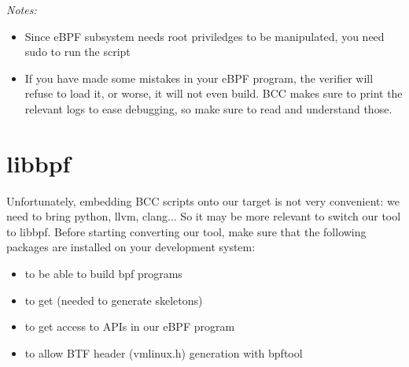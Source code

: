 {\em Notes:
\begin{itemize}
    \item Since eBPF subsystem needs root priviledges to be manipulated, you need sudo to run the script
    \item If you have made some mistakes in your eBPF program, the verifier
    will refuse to load it, or worse, it will not even build. BCC makes sure to
    print the relevant logs to ease debugging, so make sure to read
    and understand those.
\end{itemize}}

\section{libbpf}

Unfortunately, embedding BCC scripts onto our target is not very convenient: we need to bring python, llvm, clang... So it may be more relevant to switch our tool to libbpf. Before starting converting our tool, make sure that the following packages are installed on your development system:
\begin{itemize}
  \item {} to be able to build bpf programs
  \item {} to get  (needed to generate skeletons)
  \item {} to get access to  APIs in our eBPF program
  \item {} to allow BTF header (vmlinux.h) generation with bpftool
\end{itemize}

